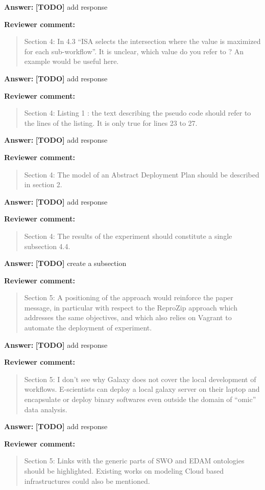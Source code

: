 \documentclass{letter}
\newenvironment{review}%
{\textbf{Reviewer comment:}\begin{quote}}%
{\end{quote}}%
\newcommand{\todo}[1]{%
      \color{red}\textbf{[TODO]} #1\color{black}}
\newcommand{\answer}[1]{%
      \textbf{Answer:} #1}
\begin{document}
\begin{letter}{}
\answer{\todo{add response}}


\begin{review}
Section 4: In 4.3 ``ISA selects the intersection where the value is maximized for each sub-workflow''. It is unclear, which value do you refer to ? An example would be useful here.
\end{review}

\answer{\todo{add response}}


\begin{review}
Section 4: Listing 1 : the text describing the pseudo code should refer to the lines of the listing. It is only true for lines 23 to 27.
\end{review}

\answer{\todo{add response}}


\begin{review}
Section 4: The model of an Abstract Deployment Plan should be described in section 2.
\end{review}

\answer{\todo{add response}}


\begin{review}
Section 4: The results of the experiment should constitute a single subsection 4.4.
\end{review}

\answer{\todo{create a subsection}}


\begin{review}
Section 5: A positioning of the approach would reinforce the paper message, in particular with respect to the ReproZip approach which addresses the same objectives, and which also relies on Vagrant to automate the deployment of experiment.
\end{review}

\answer{\todo{add response}}


\begin{review}
Section 5: I don't see why Galaxy does not cover the local development of workflows. E-scientists can deploy a local galaxy server on their laptop and encapsulate or deploy binary softwares even outside the domain of ``omic'' data analysis.
\end{review}

\answer{\todo{add response}}


\begin{review}
Section 5: Links with the generic parts of SWO and EDAM ontologies should be highlighted. Existing works on modeling Cloud based infrastructures could also be mentioned.
\end{review}


\end{letter}
\end{document}
